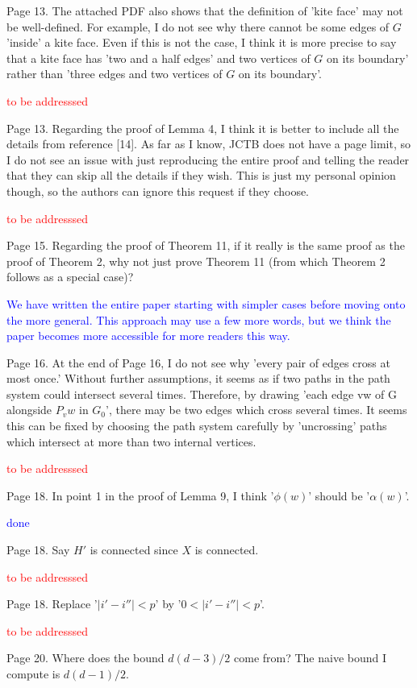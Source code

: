 \documentclass[12pt]{article}
\newcommand{\done}{\textcolor{blue}{done}}
\newcommand{\tba}{\textcolor{red}{to be addresssed}}
\begin{document}
Page 13. The attached PDF also shows that the definition of 'kite
face' may not be well-defined.  For example, I do not see why there
cannot be some edges of $G$ 'inside' a kite face.  Even if this is not
the case, I think it is more precise to say that a kite face has 'two
and a half edges' and two vertices of $G$ on its boundary' rather than
'three edges and two vertices of $G$ on its boundary'.

\tba

Page 13.  Regarding the proof of Lemma 4, I think it is better to
include all the details from reference [14].  As far as I know, JCTB
does not have a page limit, so I do not see an issue with just
reproducing the entire proof and telling the reader that they can skip
all the details if they wish.  This is just my personal opinion
though, so the authors can ignore this request if they choose.

\tba

Page 15. Regarding the proof of Theorem 11, if it really is the same
proof as the proof of Theorem 2, why not just prove Theorem 11 (from
which Theorem 2 follows as a special case)?

\textcolor{blue}{We have written the entire paper starting with simpler cases before moving onto the more general. This approach may use a few more words, but we think the paper becomes more accessible for more readers this way.}

Page 16.  At the end of Page 16, I do not see why 'every pair of edges
cross at most once.'  Without further assumptions, it seems as if two
paths in the path system could intersect several times.  Therefore, by
drawing 'each edge vw of G alongside $P_vw$ in $G_0$', there may be two
edges which cross several times.  It seems this can be fixed by
choosing the path system carefully by 'uncrossing' paths which
intersect at more than two internal vertices.

\tba

Page 18. In point 1 in the proof of Lemma 9, I think '$\phi(w)$' should
be '$\alpha(w)$'.

\done

Page 18.  Say $H'$ is connected since $X$ is connected.

\tba

Page 18.  Replace '$|i'-i''| < p$' by  '$0< |i'-i''| < p$'.

\tba

Page 20.  Where does the bound $d(d-3)/2$ come from?  The naive bound I
compute is $d(d-1)/2$.
\end{document}
